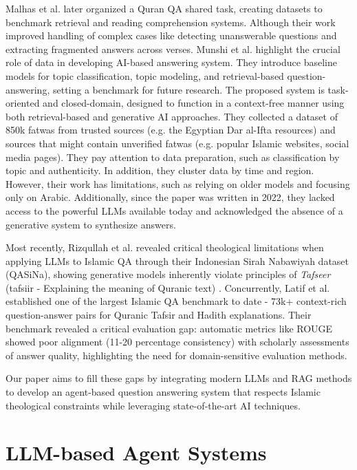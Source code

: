 Malhas et al. \cite{malhas2023qur}  later organized a Quran QA shared task, creating datasets to benchmark retrieval and reading comprehension systems. Although their work improved handling of complex cases like detecting unanswerable questions and extracting fragmented answers across verses. Munshi et al. \cite{munshi2021towards} highlight the crucial role of data in developing AI-based answering system. They introduce baseline models for topic classification, topic modeling, and retrieval-based question-answering, setting a benchmark for future research. The proposed system is task-oriented and closed-domain, designed to function in a context-free manner using both retrieval-based and generative AI approaches. They collected a dataset of 850k fatwas from trusted sources (e.g. the Egyptian Dar al-Ifta resources) and sources that might contain unverified fatwas (e.g. popular Islamic websites, social media pages). They pay attention to data preparation, such as classification by topic and authenticity. In addition, they cluster data by time and region. However, their work has limitations, such as relying on older models and focusing only on Arabic. Additionally, since the paper was written in 2022, they lacked access to the powerful LLMs available today and acknowledged the absence of a generative system to synthesize answers.

Most recently, Rizqullah et al. \cite{rizqullah2023qasina} revealed critical theological limitations when applying LLMs to Islamic QA through their Indonesian Sirah Nabawiyah dataset (QASiNa), showing generative models inherently violate principles of \textit{Tafseer} (tafsiir - Explaining the meaning of Quranic text) \cite{saleh2011dictionary}.
Concurrently, Latif et al. \cite{qamar2024benchmark} established one of the largest Islamic QA benchmark to date - 73k+ context-rich question-answer pairs for Quranic Tafsir and Hadith explanations. Their benchmark revealed a critical evaluation gap: automatic metrics like ROUGE showed poor alignment (11-20 percentage consistency) with scholarly assessments of answer quality, highlighting the need for domain-sensitive evaluation methods.

Our paper aims to fill these gaps by integrating modern LLMs and RAG methods to develop an agent-based question answering system that respects Islamic theological constraints while leveraging state-of-the-art AI techniques.

\section{LLM-based Agent Systems}


